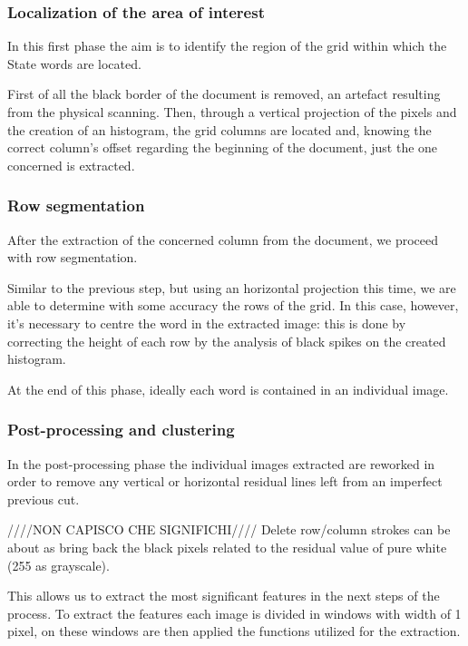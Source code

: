 \subsubsection{Localization of the area of interest}

In this first phase the aim is to identify the region of the grid within which the State words are located. 

First of all the black border of the document is removed, an artefact resulting from the physical scanning. Then, through a vertical projection of the pixels and the creation of an histogram, the grid columns are located and, knowing the correct column's offset regarding the beginning of the document, just the one concerned is extracted.

\subsubsection{Row segmentation}

After the extraction of the concerned column from the document, we proceed with row segmentation.

Similar to the previous step, but using an horizontal projection this time, we are able to determine with some accuracy the rows of the grid. In this case, however, it's necessary to centre the word in the extracted image: this is done by correcting the height of each row by the analysis of black spikes on the created histogram.

At the end of this phase, ideally each word is contained in an individual image.

\subsubsection{Post-processing and clustering}
\label{oldFeatures}
In the post-processing phase the individual images extracted are reworked in order to remove any  vertical or horizontal residual lines left from an imperfect previous cut.

////NON CAPISCO CHE SIGNIFICHI////
Delete row/column strokes can be about as bring back the black pixels related to the residual value of pure white (255 as grayscale).

This allows us to extract the most significant features in the next steps of the process.
To extract the features each image is divided in windows with width of 1 pixel, on these windows are then applied the functions utilized for the extraction.

